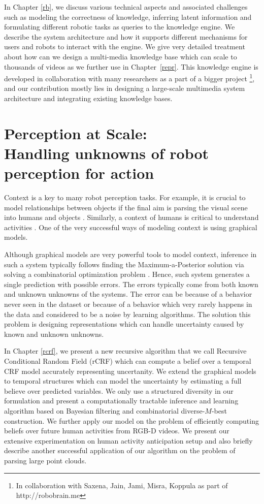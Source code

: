 In Chapter \ref{rb}, we discuss various technical aspects and associated challenges such as modeling the correctness of knowledge, inferring latent information and formulating different robotic tasks as  queries to the knowledge engine. We describe the system architecture and how it supports different mechanisms for users and robots to interact with the engine. We give very detailed treatment about how can we design a multi-media knowledge base which can scale to thousands of videos as we further use in Chapter~\ref{repr}. This knowledge engine is developed in collaboration with many researchers as a part of a bigger project  \footnote{In collaboration with Saxena, Jain, Jami, Misra, Koppula as part of http://robobrain.me}, and our contribution mostly lies in designing a large-scale multimedia system architecture and  integrating existing knowledge bases. 


\section{Perception at Scale: \\  Handling unknowns of robot perception for action}
Context is a key to many robot perception tasks. For example, it is crucial to model relationships between objects if the final aim is parsing the visual scene into humans and objects \cite{KoppulaIJRR2012}. Similarly, a context of humans is critical to understand activities \cite{hemaIJRR, hall}. One of the very successful ways of modeling context is using graphical models. 

Although graphical models are very powerful tools to model context, inference in such a system typically follows finding the Maximum-a-Posterior solution via solving a combinatorial optimization problem . Hence, such system generates a single prediction with possible errors. The errors typically come from both known and unknown unknowns of the systems. The error can be because of a behavior never seen in the dataset or because of a behavior which very rarely happens in the data and considered to be a noise by learning algorithms. The solution this problem is designing representations which can handle uncertainty caused by known and unknown unknowns.

In Chapter \ref{rcrf}, we present a new recursive algorithm that we call Recursive Conditional Random Field (rCRF) which can compute a belief over a temporal CRF model accurately representing uncertanity. We extend the graphical models to temporal structures which can model the uncertainty by estimating a full believe over predicted variables. We only use a structured diversity in our formulation and present a computationally tractable inference and learning algorithm based on Bayesian filtering and combinatorial diverse-$M$-best construction. We further apply our model on the problem of efficiently computing beliefs over future human activities from RGB-D videos. We present our extensive experimentation on human activity anticipation setup and also briefly describe another successful application of our algorithm on the problem of parsing large point clouds.



